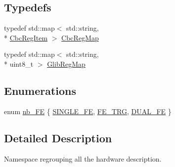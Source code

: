 \subsection*{Typedefs}
\begin{DoxyCompactItemize}
\item 
typedef std\-::map$<$ std\-::string, \\*
\hyperlink{struct_ph2___hw_description_1_1_cbc_reg_item}{Cbc\-Reg\-Item} $>$ \hyperlink{namespace_ph2___hw_description_a9a23b373068f169aa67ca1d22c9a6001}{Cbc\-Reg\-Map}
\item 
typedef std\-::map$<$ std\-::string, \\*
uint8\-\_\-t $>$ \hyperlink{namespace_ph2___hw_description_afc0e75a92548c3406e89bf39ca4c9bfb}{Glib\-Reg\-Map}
\end{DoxyCompactItemize}
\subsection*{Enumerations}
\begin{DoxyCompactItemize}
\item 
enum \hyperlink{namespace_ph2___hw_description_a891c19542f306c932b747f42fe48fc2b}{nb\-\_\-\-F\-E} \{ \hyperlink{namespace_ph2___hw_description_a891c19542f306c932b747f42fe48fc2baa30d72f6d58dc25b003fbf8bf56b3ace}{S\-I\-N\-G\-L\-E\-\_\-\-F\-E}, 
\hyperlink{namespace_ph2___hw_description_a891c19542f306c932b747f42fe48fc2ba6e0b877d015d017f61b07618e057c452}{F\-E\-\_\-\-T\-R\-G}, 
\hyperlink{namespace_ph2___hw_description_a891c19542f306c932b747f42fe48fc2bae3b57cb16641bb367bfc57a00315a4ca}{D\-U\-A\-L\-\_\-\-F\-E}
 \}
\end{DoxyCompactItemize}


\subsection{Detailed Description}
Namespace regrouping all the hardware description. 

